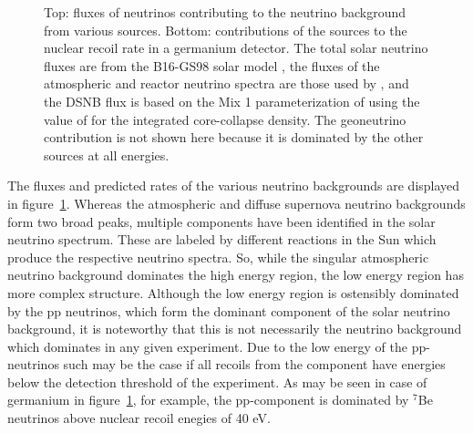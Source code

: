 \documentclass[b5paper, 10pt, twoside]{book}
\newcommand{\unitv}[1]{\symbfit{\hat{#1}}}
\begin{document}
\begin{figure}
\caption{Top: fluxes of neutrinos contributing to the neutrino background from various sources. Bottom: contributions of the sources to the nuclear recoil rate in a germanium detector. The total solar neutrino fluxes are from the B16-GS98 solar model \parencite{Vinyoles2017}, the fluxes of the atmospheric and reactor neutrino spectra are those used by \textcite{OHare2021}, and the DSNB flux is based on the Mix 1 parameterization of \textcite{VitaglianoTamborraRaffelt2020} using the value of \textcite{YukselEtAl2008} for the integrated core-collapse density. The geoneutrino contribution is not shown here because it is dominated by the other sources at all energies.}
\label{fig:neutrino-background}
\end{figure}

The fluxes and predicted rates of the various neutrino backgrounds are displayed in figure~\ref{fig:neutrino-background}. Whereas the atmospheric and diffuse supernova neutrino backgrounds form two broad peaks, multiple components have been identified in the solar neutrino spectrum. These are labeled by different reactions in the Sun which produce the respective neutrino spectra. So, while the singular atmospheric neutrino background dominates the high energy region, the low energy region has more complex structure. Although the low energy region is ostensibly dominated by the pp neutrinos, which form the dominant component of the solar neutrino background, it is noteworthy that this is not necessarily the neutrino background which dominates in any given experiment. Due to the low energy of the pp-neutrinos such may be the case if all recoils from the component have energies below the detection threshold of the experiment. As may be seen in case of germanium in figure~\ref{fig:neutrino-background}, for example, the pp-component is dominated by $^{7}$Be neutrinos above nuclear recoil enegies of 40 eV.
\end{document}
